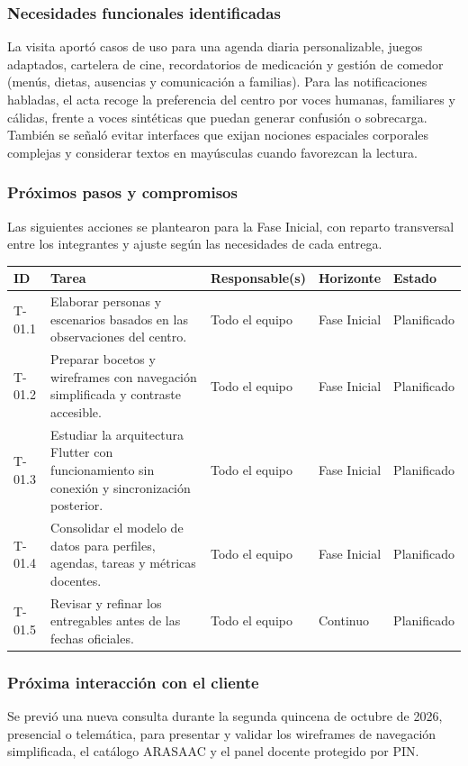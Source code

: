\subsubsection{Necesidades funcionales identificadas}
La visita aportó casos de uso para una agenda diaria personalizable, juegos adaptados, cartelera de cine, recordatorios de medicación y gestión de comedor (menús, dietas, ausencias y comunicación a familias). Para las notificaciones habladas, el acta recoge la preferencia del centro por voces humanas, familiares y cálidas, frente a voces sintéticas que puedan generar confusión o sobrecarga. También se señaló evitar interfaces que exijan nociones espaciales corporales complejas y considerar textos en mayúsculas cuando favorezcan la lectura.

\subsubsection{Próximos pasos y compromisos}
Las siguientes acciones se plantearon para la Fase Inicial, con reparto transversal entre los integrantes y ajuste según las necesidades de cada entrega.

\begin{center}\footnotesize
\begin{tabularx}{\textwidth}{@{}p{}X p{}p{}p{}@{}}
\toprule
\rowcolor{tableHeader} ID & Tarea & Responsable(s) & Horizonte & Estado \\
\midrule
T-01.1 & Elaborar personas y escenarios basados en las observaciones del centro. & Todo el equipo & Fase Inicial & Planificado \\
T-01.2 & Preparar bocetos y wireframes con navegación simplificada y contraste accesible. & Todo el equipo & Fase Inicial & Planificado \\
T-01.3 & Estudiar la arquitectura Flutter con funcionamiento sin conexión y sincronización posterior. & Todo el equipo & Fase Inicial & Planificado \\
T-01.4 & Consolidar el modelo de datos para perfiles, agendas, tareas y métricas docentes. & Todo el equipo & Fase Inicial & Planificado \\
T-01.5 & Revisar y refinar los entregables antes de las fechas oficiales. & Todo el equipo & Continuo & Planificado \\
\bottomrule
\end{tabularx}
\end{center}

\subsubsection{Próxima interacción con el cliente}
Se previó una nueva consulta durante la segunda quincena de octubre de 2026, presencial o telemática, para presentar y validar los wireframes de navegación simplificada, el catálogo ARASAAC y el panel docente protegido por PIN.

